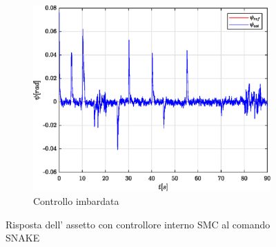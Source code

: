 \begin{figure}
	\hfill
	\begin{subfigure}{0.45\textwidth}
		\centering
		\includegraphics[width=1\textwidth]{Simulazioni/Figure/SMC/SNAKE/AttitudeControlYaw}
		\caption{Controllo imbardata}
		\label{fig:SNAKEyawSMC}
	\end{subfigure}
	\caption{Risposta dell' assetto con controllore interno SMC al comando SNAKE}
\end{figure}


